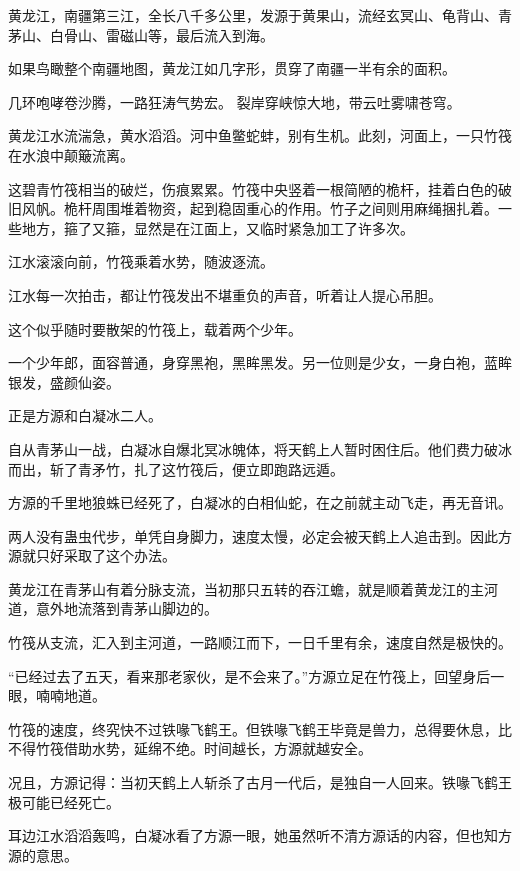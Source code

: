 
\begin{this_body}

黄龙江，南疆第三江，全长八千多公里，发源于黄果山，流经玄冥山、龟背山、青茅山、白骨山、雷磁山等，最后流入到海。

如果鸟瞰整个南疆地图，黄龙江如几字形，贯穿了南疆一半有余的面积。

几环咆哮卷沙腾，一路狂涛气势宏。 裂岸穿峡惊大地，带云吐雾啸苍穹。

黄龙江水流湍急，黄水滔滔。河中鱼鳖蛇蚌，别有生机。此刻，河面上，一只竹筏在水浪中颠簸流离。

这碧青竹筏相当的破烂，伤痕累累。竹筏中央竖着一根简陋的桅杆，挂着白色的破旧风帆。桅杆周围堆着物资，起到稳固重心的作用。竹子之间则用麻绳捆扎着。一些地方，箍了又箍，显然是在江面上，又临时紧急加工了许多次。

江水滚滚向前，竹筏乘着水势，随波逐流。

江水每一次拍击，都让竹筏发出不堪重负的声音，听着让人提心吊胆。

这个似乎随时要散架的竹筏上，载着两个少年。

一个少年郎，面容普通，身穿黑袍，黑眸黑发。另一位则是少女，一身白袍，蓝眸银发，盛颜仙姿。

正是方源和白凝冰二人。

自从青茅山一战，白凝冰自爆北冥冰魄体，将天鹤上人暂时困住后。他们费力破冰而出，斩了青矛竹，扎了这竹筏后，便立即跑路远遁。

方源的千里地狼蛛已经死了，白凝冰的白相仙蛇，在之前就主动飞走，再无音讯。

两人没有蛊虫代步，单凭自身脚力，速度太慢，必定会被天鹤上人追击到。因此方源就只好采取了这个办法。

黄龙江在青茅山有着分脉支流，当初那只五转的吞江蟾，就是顺着黄龙江的主河道，意外地流落到青茅山脚边的。

竹筏从支流，汇入到主河道，一路顺江而下，一日千里有余，速度自然是极快的。

“已经过去了五天，看来那老家伙，是不会来了。”方源立足在竹筏上，回望身后一眼，喃喃地道。

竹筏的速度，终究快不过铁喙飞鹤王。但铁喙飞鹤王毕竟是兽力，总得要休息，比不得竹筏借助水势，延绵不绝。时间越长，方源就越安全。

况且，方源记得：当初天鹤上人斩杀了古月一代后，是独自一人回来。铁喙飞鹤王极可能已经死亡。

耳边江水滔滔轰鸣，白凝冰看了方源一眼，她虽然听不清方源话的内容，但也知方源的意思。


\end{this_body}
